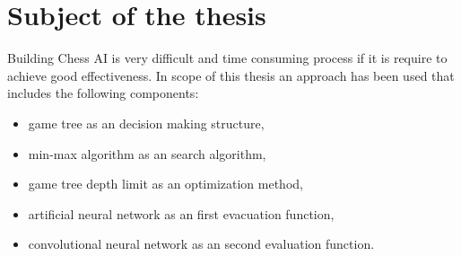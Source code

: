 

\chapter{Subject of the thesis}
Building Chess AI is very difficult and time consuming process if it is require to achieve good effectiveness. In scope of this thesis an approach has been used that includes the following components:
\begin{itemize}
	\item game tree as an decision making structure,
	\item min-max algorithm as an search algorithm,
	\item game tree depth limit as an optimization method,
	\item artificial neural network as an first evacuation function,
	\item convolutional neural network as an second evaluation function.
\end{itemize}

